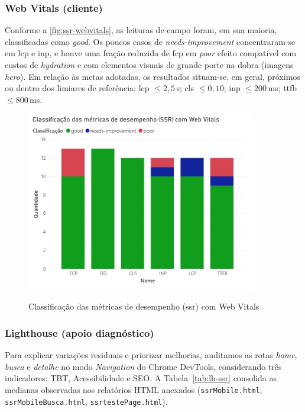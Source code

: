 \subsubsection{Web Vitals (cliente)}
Conforme a \autoref{fig:ssr-webvitals}, as leituras de campo foram, em sua maioria, classificadas como \textit{good}. Os poucos casos de \textit{needs-improvement} concentraram-se em \acrshort{lcp} e \acrshort{inp}, e houve uma fração reduzida de \acrshort{fcp} em \textit{poor} efeito compatível com custos de \textit{hydration} e com elementos visuais de grande porte na dobra (imagens \emph{hero}). Em relação às metas adotadas, os resultados situam-se, em geral, próximos ou dentro dos limiares de referência: \acrshort{lcp} $\leq 2{,}5$\,s; \acrshort{cls} $\leq 0{,}10$; \acrshort{inp} $\leq 200$\,ms; \acrshort{ttfb} $\leq 800$\,ms.

\begin{figure}[H]
    \centering
    \caption{Classificação das métricas de desempenho (\acrshort{ssr}) com Web Vitals}
    \includegraphics[width=0.9\textwidth]{media/metricas_ssr_web_vitals.jpeg}
    \label{fig:ssr-webvitals}
\end{figure}

\subsubsection{Lighthouse (apoio diagnóstico)}
Para explicar variações residuais e priorizar melhorias, auditamos as rotas \emph{home}, \emph{busca} e \emph{detalhe} no modo \emph{Navigation} do Chrome DevTools, considerando três indicadores: TBT, Acessibilidade e SEO.
A Tabela~\ref{tab:lh-ssr} consolida as medianas observadas nos relatórios HTML anexados (\texttt{ssrMobile.html}, \texttt{ssrMobileBusca.html}, \texttt{ssrtestePage.html}).

